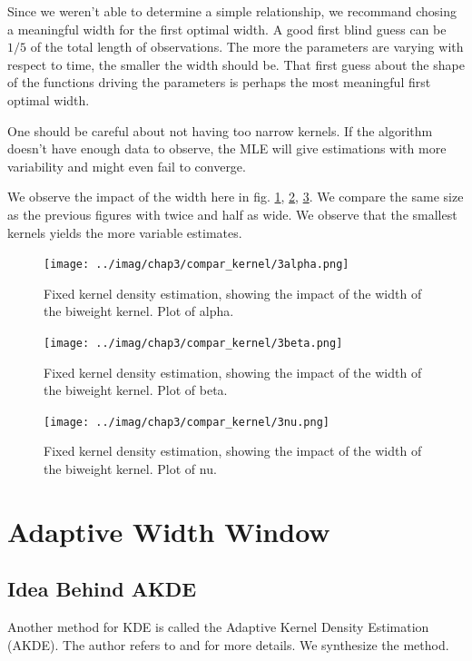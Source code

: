 \documentclass[11pt]{book}
\begin{document}
Since we weren't able to determine a simple relationship, we recommand chosing a meaningful width for the first optimal width. A good first blind guess can be $1/5$ of the total length of observations. The more the parameters are varying with respect to time, the smaller the width should be. That first guess about the shape of the functions driving the parameters is perhaps the most meaningful first optimal width.

\begin{remarque}
One should be careful about not having too narrow kernels. If the algorithm doesn't have enough data to observe, the MLE will give estimations with more variability and might even fail to converge.
\end{remarque}

We observe the impact of the width here in fig. \ref{fig:basic_3_kernels_alpha}, \ref{fig:basic_3_kernels_beta}, \ref{fig:basic_3_kernels_nu}. We compare the same size as the previous figures with twice and half as wide. We observe that the smallest kernels yields the more variable estimates.

\begin{figure}
\centering
\texttt{[image: ../imag/chap3/compar\_kernel/3alpha.png]}
\caption{Fixed kernel density estimation, showing the impact of the width of the biweight kernel. Plot of alpha.}
\label{fig:basic_3_kernels_alpha}
\end{figure}

\begin{figure}
\centering
\texttt{[image: ../imag/chap3/compar\_kernel/3beta.png]}
\caption{Fixed kernel density estimation, showing the impact of the width of the biweight kernel. Plot of beta.}
\label{fig:basic_3_kernels_beta}
\end{figure}

\begin{figure}
\centering
\texttt{[image: ../imag/chap3/compar\_kernel/3nu.png]}
\caption{Fixed kernel density estimation, showing the impact of the width of the biweight kernel. Plot of nu.}
\label{fig:basic_3_kernels_nu}
\end{figure}




\section{Adaptive Width Window}
\subsection{Idea Behind AKDE}
Another method for KDE is called the Adaptive Kernel Density Estimation (AKDE). The author refers to \cite{Methods_ESTIM} and \cite{AKDE_ex} for more details. We synthesize the method.
\end{document}
